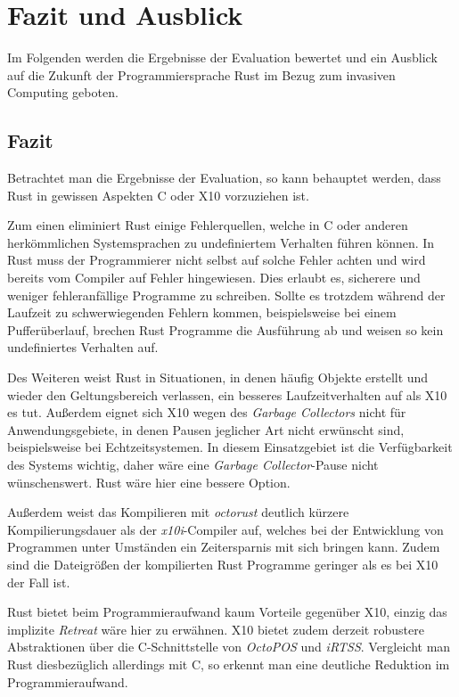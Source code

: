 \chapter{Fazit und Ausblick}\label{sec:conclusion}

Im Folgenden werden die Ergebnisse der Evaluation bewertet
und ein Ausblick auf die Zukunft der Programmiersprache Rust im Bezug zum invasiven Computing geboten.

\section{Fazit}

Betrachtet man die Ergebnisse der Evaluation, so kann behauptet werden,
dass Rust in gewissen Aspekten C oder X10 vorzuziehen ist.

Zum einen eliminiert Rust einige Fehlerquellen, welche in C oder anderen herkömmlichen
Systemsprachen zu undefiniertem Verhalten führen können.
In Rust muss der Programmierer nicht selbst auf solche Fehler achten und wird bereits vom Compiler auf Fehler
hingewiesen. Dies erlaubt es, sicherere und weniger fehleranfällige Programme zu schreiben.
Sollte es trotzdem während der Laufzeit zu schwerwiegenden Fehlern kommen, beispielsweise bei einem Pufferüberlauf,
brechen Rust Programme die Ausführung ab und weisen so kein undefiniertes Verhalten auf.

Des Weiteren weist Rust in Situationen, in denen häufig Objekte erstellt und wieder den Geltungsbereich verlassen,
ein besseres Laufzeitverhalten auf als X10 es tut. Außerdem eignet sich X10 wegen des \textit{Garbage Collectors}
nicht für Anwendungsgebiete, in denen Pausen jeglicher Art nicht erwünscht sind,
beispielsweise bei Echtzeitsystemen.
In diesem Einsatzgebiet ist die Verfügbarkeit des Systems wichtig, daher wäre eine \textit{Garbage Collector}-Pause
nicht wünschenswert. Rust wäre hier eine bessere Option.

Außerdem weist das Kompilieren mit \textit{octorust} deutlich kürzere Kompilierungsdauer
als der \textit{x10i}-Compiler auf,
welches bei der Entwicklung von Programmen unter Umständen ein Zeitersparnis
mit sich bringen kann. 
Zudem sind die Dateigrößen der kompilierten Rust Programme geringer als es bei X10 der Fall ist.

Rust bietet beim Programmieraufwand kaum Vorteile gegenüber X10, einzig das implizite \textit{Retreat} wäre hier zu 
erwähnen.
X10 bietet zudem derzeit robustere Abstraktionen über die C-Schnittstelle von \textit{OctoPOS} und
\textit{iRTSS}.
Vergleicht man Rust diesbezüglich allerdings mit C, so erkennt man eine deutliche Reduktion im Programmieraufwand.

